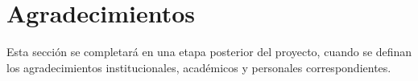 \chapter*{Agradecimientos}

Esta secci\'on se completar\'a en una etapa posterior del proyecto, cuando se definan los agradecimientos institucionales, acad\'emicos y personales correspondientes.
